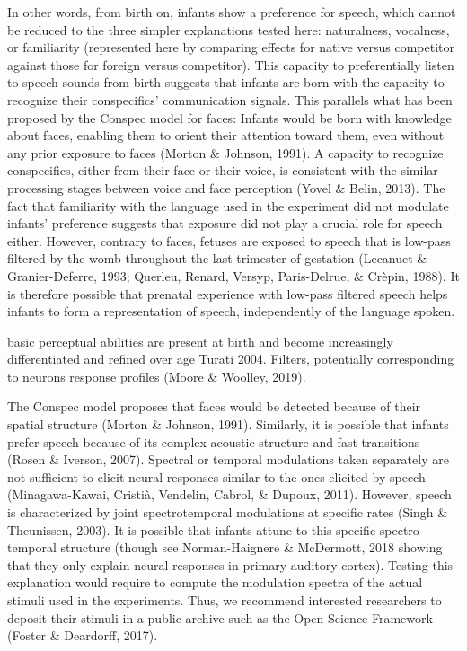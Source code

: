 \documentclass[man]{apa6}
\begin{document}
In other words, from birth on, infants show a preference for speech,
which cannot be reduced to the three simpler explanations tested here:
naturalness, vocalness, or familiarity (represented here by comparing
effects for native versus competitor against those for foreign versus
competitor). This capacity to preferentially listen to speech sounds
from birth suggests that infants are born with the capacity to recognize
their conspecifics' communication signals. This parallels what has been
proposed by the Conspec model for faces: Infants would be born with
knowledge about faces, enabling them to orient their attention toward
them, even without any prior exposure to faces (Morton \& Johnson,
1991). A capacity to recognize conspecifics, either from their face or
their voice, is consistent with the similar processing stages between
voice and face perception (Yovel \& Belin, 2013). The fact that
familiarity with the language used in the experiment did not modulate
infants' preference suggests that exposure did not play a crucial role
for speech either. However, contrary to faces, fetuses are exposed to
speech that is low-pass filtered by the womb throughout the last
trimester of gestation (Lecanuet \& Granier-Deferre, 1993; Querleu,
Renard, Versyp, Paris-Delrue, \& Crèpin, 1988). It is therefore possible
that prenatal experience with low-pass filtered speech helps infants to
form a representation of speech, independently of the language spoken.

basic perceptual abilities are present at birth and become increasingly
differentiated and refined over age Turati 2004. Filters, potentially
corresponding to neurons response profiles (Moore \& Woolley, 2019).

The Conspec model proposes that faces would be detected because of their
spatial structure (Morton \& Johnson, 1991). Similarly, it is possible
that infants prefer speech because of its complex acoustic structure and
fast transitions (Rosen \& Iverson, 2007). Spectral or temporal
modulations taken separately are not sufficient to elicit neural
responses similar to the ones elicited by speech (Minagawa-Kawai,
Cristià, Vendelin, Cabrol, \& Dupoux, 2011). However, speech is
characterized by joint spectrotemporal modulations at specific rates
(Singh \& Theunissen, 2003). It is possible that infants attune to this
specific spectro-temporal structure (though see Norman-Haignere \&
McDermott, 2018 showing that they only explain neural responses in
primary auditory cortex). Testing this explanation would require to
compute the modulation spectra of the actual stimuli used in the
experiments. Thus, we recommend interested researchers to deposit their
stimuli in a public archive such as the Open Science Framework (Foster
\& Deardorff, 2017).
\end{document}

